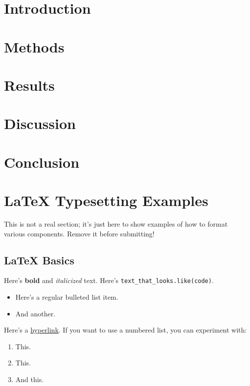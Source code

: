 \documentclass[12pt,letterpaper]{article}
\begin{document}
\maketoc
\clearpage


\section{Introduction}

\section{Methods}

\section{Results}

\section{Discussion}

\section{Conclusion}

\section{\LaTeX{} Typesetting Examples}

{\color{blue} This is not a real section; it's just here to show examples of how to format various components. Remove it before submitting!}

\subsection{\LaTeX{} Basics}

Here's \textbf{bold} and \textit{italicized} text. Here's \texttt{text\_that\_looks.like(code)}.

\begin{itemize}
    \item Here's a regular bulleted list item.
    \item And another.
\end{itemize}

Here's a \href{https://datascience.ucsd.edu}{hyperlink}. If you want to use a numbered list, you can experiment with:

\begin{enumerate}
    \item This.
    \item This.
    \item And this.
\end{enumerate}
\end{document}
